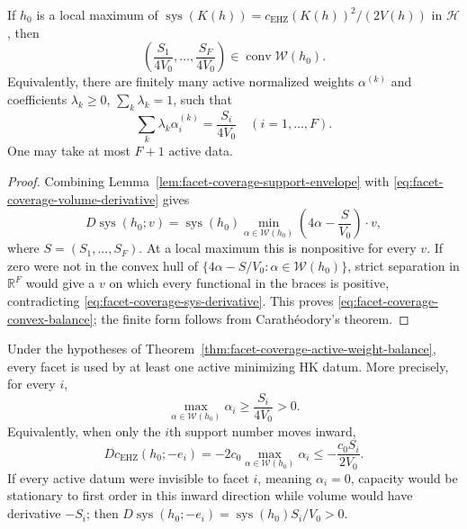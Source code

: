 \begin{unverified}
\begin{theorem}
\label{thm:facet-coverage-active-weight-balance}
If $h_0$ is a local maximum of
$\operatorname{sys}(K(h))=c_{\mathrm{EHZ}}(K(h))^2/(2V(h))$ in
$\mathcal H$, then
\begin{equation}\label{eq:facet-coverage-convex-balance}
  \left(\frac{S_1}{4V_0},\ldots,\frac{S_F}{4V_0}\right)
  \in\operatorname{conv}\mathcal W(h_0).
\end{equation}
Equivalently, there are finitely many active normalized weights
$\alpha^{(k)}$ and coefficients $\lambda_k\geq0$, $\sum_k\lambda_k=1$, such
that
\begin{equation}\label{eq:facet-coverage-coordinate-balance}
  \sum_k\lambda_k\alpha_i^{(k)}=\frac{S_i}{4V_0}
  \quad(i=1,\ldots,F).
\end{equation}
One may take at most $F+1$ active data.
\end{theorem}

\begin{proof}
Combining Lemma~\ref{lem:facet-coverage-support-envelope} with
\eqref{eq:facet-coverage-volume-derivative} gives
\begin{equation}\label{eq:facet-coverage-sys-derivative}
  D\operatorname{sys}(h_0;v)
  =\operatorname{sys}(h_0)
   \min_{\alpha\in\mathcal W(h_0)}
   \left(4\alpha-\frac{S}{V_0}\right)\!\cdot v,
\end{equation}
where $S=(S_1,\ldots,S_F)$.  At a local maximum this is nonpositive for every
$v$.  If zero were not in the convex hull of
$\{4\alpha-S/V_0:\alpha\in\mathcal W(h_0)\}$, strict separation in
$\mathbb R^F$ would give a $v$ on which every functional in the braces is
positive, contradicting \eqref{eq:facet-coverage-sys-derivative}.  This proves
\eqref{eq:facet-coverage-convex-balance}; the finite form follows from
Carath\'eodory's theorem.
\end{proof}

\begin{corollary}
\label{cor:facet-coverage-active-orbit}
Under the hypotheses of
Theorem~\ref{thm:facet-coverage-active-weight-balance}, every facet is used by
at least one active minimizing HK datum.  More precisely, for every $i$,
\begin{equation}\label{eq:facet-coverage-quantitative}
  \max_{\alpha\in\mathcal W(h_0)}\alpha_i
  \geq \frac{S_i}{4V_0}>0.
\end{equation}
Equivalently, when only the $i$th support number moves inward,
\begin{equation}\label{eq:facet-coverage-inward-capacity-drop}
  Dc_{\mathrm{EHZ}}(h_0;-e_i)
  =-2c_0\max_{\alpha\in\mathcal W(h_0)}\alpha_i
  \leq-\frac{c_0S_i}{2V_0}.
\end{equation}
If every active datum were invisible to facet $i$, meaning
$\alpha_i=0$, capacity would be stationary to first order in this inward
direction while volume would have derivative $-S_i$; then
$D\operatorname{sys}(h_0;-e_i)=\operatorname{sys}(h_0)S_i/V_0>0$.
\end{corollary}


\end{unverified}
